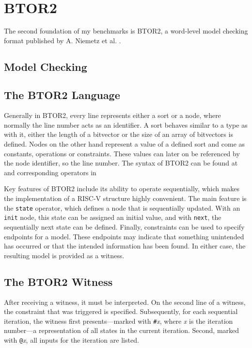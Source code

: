 \chapter{BTOR2}\label{chap:btor2}

The second foundation of my benchmarks is BTOR2, a word-level model checking
format published by A. Niemetz et al. \cite{btor2}.

\section{Model Checking}

\section{The BTOR2 Language}
Generally in BTOR2, every line represents either a sort or a node, where
normally the line number acts as an identifier. A sort behaves similar to a
type as with it, either the length of a bitvector or the size of an array of
bitvectors is defined. Nodes on the other hand represent a value of a defined
sort and come as constants, operations or constraints. These values can later
on be referenced by the node identifier, so the line number. The syntax of
BTOR2 can be found at \cite[figure 1]{btor2} and corresponding operators in
\cite[table 1]{btor2}

Key features of BTOR2 include its ability to operate sequentially, which makes
the implementation of a RISC-V structure highly convenient. The main feature is
the \texttt{state} operator, which defines a node that is sequentially updated.
With an \texttt{init} node, this state can be assigned an initial value, and
with \texttt{next}, the sequentially next state can be defined. Finally,
constraints can be used to specify endpoints for a model. These endpoints may
indicate that something unintended has occurred or that the intended
information has been found. In either case, the resulting model is provided as
a witness.

\section{The BTOR2 Witness}\label{witness}
After receiving a witness, it must be interpreted. On the second line of a
witness, the constraint that was triggered is specified. Subsequently, for each
sequential iteration, the witness first presents—marked with
\texttt{\#}\textit{x}, where \textit{x} is the iteration number—a
representation of all states in the current iteration. Second, marked with
\texttt{@}\textit{x}, all inputs for the iteration are listed.

